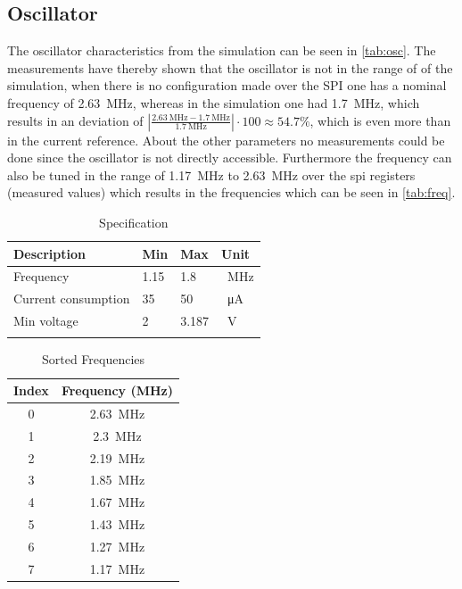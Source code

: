 \subsection{Oscillator}
The oscillator characteristics from the simulation can be seen in \autoref{tab:osc}. The measurements have thereby shown that the oscillator is not in the range of of the simulation, when there is no configuration made over the SPI one has a nominal frequency of \qty{2.63}{\mega\hertz}, whereas in the simulation one had \qty{1.7}{\mega\hertz}, which results in an deviation of $\left|\frac{\qty{2.63}{\mega\hertz}-\qty{1.7}{\mega\hertz}}{\qty{1.7}{\mega\hertz}}\right|\cdot 100\approx 54.7 \%$, which is even more than in the current reference. About the other parameters no measurements could be done since the oscillator is not directly accessible. Furthermore the frequency can also be tuned in the range of \qty{1.17}{\mega\hertz} to \qty{2.63}{\mega\hertz} over the spi registers (measured values) which results in the frequencies which can be seen in \autoref{tab:freq}. 
\begin{longtable}{|p{3.5cm}|p{3.5cm}|p{3.5cm}|p{3.5cm}|}
	\hline
	\rowcolor{lightgray}
	\textbf{Description} &\textbf{Min} &\textbf{Max} & \textbf{Unit} \\ \hline
	
	Frequency & 1.15 & 1.8 &\qty{}{\mega\hertz} \\ \hline
	Current consumption & 35 & 50 & \qty{}{\micro\ampere} \\ \hline
	Min voltage & 2& 3.187 & \qty{}{\volt} \\ \hline
	\caption{Specification} %
	\label{tab:osc}
\end{longtable}
\begin{table}[h]
	\centering
	\begin{tabular}{|c|c|}
		\hline
		\rowcolor{lightgray}
		Index & Frequency (MHz) \\
		\hline
		0 & \qty{2.63}{\mega\hertz} \\
		\hline
		1 & \qty{2.3}{\mega\hertz} \\
		\hline
		2 & \qty{2.19}{\mega\hertz} \\
		\hline
		3 & \qty{1.85}{\mega\hertz} \\
		\hline
		4 & \qty{1.67}{\mega\hertz} \\
		\hline
		5 & \qty{1.43}{\mega\hertz} \\
		\hline
		6 & \qty{1.27}{\mega\hertz} \\
		\hline
		7 & \qty{1.17}{\mega\hertz} \\
		\hline
	\end{tabular}
	\caption{Sorted Frequencies}
	\label{tab:freq}
\end{table}


